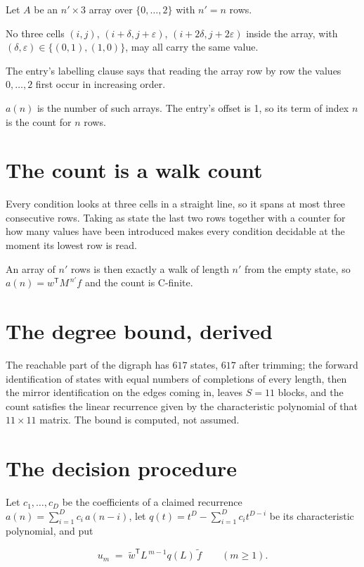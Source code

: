 \documentclass[11pt]{article}
\theoremstyle{definition}
\begin{document}
Let $A$ be an $n' \times 3$ array over $\{0,\dots,2\}$ with $n' = n$ rows.

No three cells $(i,j)$, $(i{+}\delta,j{+}\varepsilon)$, $(i{+}2\delta,j{+}2\varepsilon)$ inside the array, with $(\delta,\varepsilon) \in \{(0,1), (1,0)\}$, may all carry the same value.

The entry's labelling clause says that reading the array row by row the values $0,\dots,2$ first occur in increasing order.

$a(n)$ is the number of such arrays. The entry's offset is 1, so its term of index $n$ is the count for $n$ rows.

\section{The count is a walk count}

Every condition looks at three cells in a straight line, so it spans at most three consecutive rows. Taking as state the last two rows together with a counter for how many values have been introduced makes every condition decidable at the moment its lowest row is read.

An array of $n'$ rows is then exactly a walk of length $n'$ from the empty state, so $a(n) = w^{\mathsf T}M^{\,n'}f$ and the count is C-finite.

\section{The degree bound, derived}

The reachable part of the digraph has $617$ states, $617$ after trimming; the forward identification of states with equal numbers of completions of every length, then the mirror identification on the edges coming in, leaves $S = 11$ blocks, and the count satisfies the linear recurrence given by the characteristic polynomial of that $11\times11$ matrix. The bound is computed, not assumed.

\section{The decision procedure}

Let $c_1,\dots,c_D$ be the coefficients of a claimed recurrence $a(n) = \sum_{i=1}^{D} c_i\,a(n-i)$, let $q(t) = t^{D} - \sum_{i=1}^{D} c_i t^{D-i}$ be its characteristic polynomial, and put

\[u_m \;=\; \tilde w^{\mathsf T} L^{\,m-1} q(L)\,\tilde f \qquad (m \ge 1).\]
\end{document}
